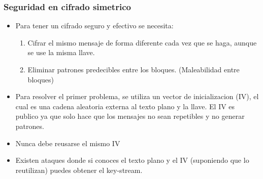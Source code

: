 \documentclass[11pt]{article}
\begin{document}
\subsubsection{Seguridad en cifrado simetrico}
\label{sec:org5d34636}
\begin{itemize}
\item Para tener un cifrado seguro y efectivo se necesita:
\begin{enumerate}
\item Cifrar el mismo mensaje de forma diferente cada vez que se haga, aunque se use la misma
llave.
\item Eliminar patrones predecibles entre los bloques. (Maleabilidad entre bloques)
\end{enumerate}

\item Para resolver el primer problema, se utiliza un vector de inicializacion (IV), el cual es una cadena aleatoria externa al texto plano y la llave. El IV es publico ya que solo hace que los mensajes no sean repetibles y no generar patrones.
\item Nunca debe reusarse el mismo IV
\item Existen ataques donde si conoces el texto plano y el IV (suponiendo que lo reutilizan) puedes obtener el key-stream.
\end{itemize}
\end{document}
